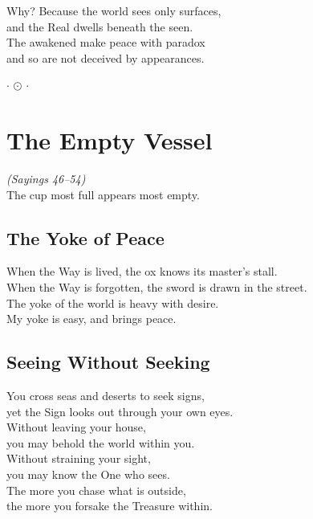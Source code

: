 \documentclass[10pt, openright]{book}
\newcommand{\ornament}{
    \vspace{1.5cm}
    \begin{center}
        \large $\cdot$ $\odot$ $\cdot$
    \end{center}
    \vspace{1.5cm}
}
\begin{document}
Why? Because the world sees only surfaces,\hfill\\
and the Real dwells beneath the seen. \\

The awakened make peace with paradox \\
and so are not deceived by appearances.

\ornament

\chapter{The Empty Vessel}
\begin{center}
    \textit{(Sayings 46--54)} \\
    \vspace{0.5cm}
    \small The cup most full appears most empty.
\end{center}
\vspace{0.5cm}

\section{The Yoke of Peace}
When the Way is lived, the ox knows its master's stall. \\
When the Way is forgotten, the sword is drawn in the street. \\

The yoke of the world is heavy with desire. \\
My yoke is easy, and brings peace.

\section{Seeing Without Seeking}
You cross seas and deserts to seek signs, \\
yet the Sign looks out through your own eyes. \\

Without leaving your house, \\
you may behold the world within you. \\
Without straining your sight, \\
you may know the One who sees. \\

The more you chase what is outside, \\
the more you forsake the Treasure within.
\end{document}
